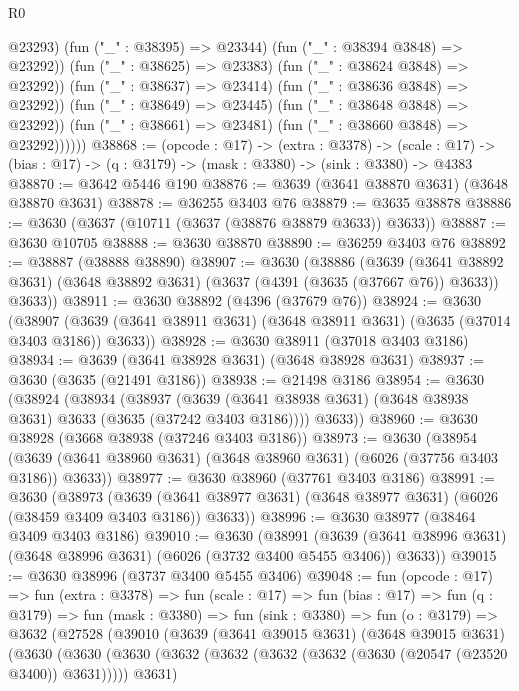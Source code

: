 \begin{lexlean}{R0}
\begin{coremodule}
                        @23293)
                      (fun ("_" : @38395) => @23344)
                      (fun ("_" : @38394 @3848) => @23292))
                    (fun ("_" : @38625) => @23383)
                    (fun ("_" : @38624 @3848) => @23292))
                  (fun ("_" : @38637) => @23414)
                  (fun ("_" : @38636 @3848) => @23292))
                (fun ("_" : @38649) => @23445)
                (fun ("_" : @38648 @3848) => @23292))
              (fun ("_" : @38661) => @23481)
              (fun ("_" : @38660 @3848) => @23292))))))
@38868 := (opcode : @17) ->
  (extra : @3378) ->
  (scale : @17) -> (bias : @17) -> (q : @3179) -> (mask : @3380) -> (sink : @3380) -> @4383
@38870 := @3642 @5446 @190
@38876 := @3639 (@3641 @38870 @3631) (@3648 @38870 @3631)
@38878 := @36255 @3403 @76
@38879 := @3635 @38878
@38886 := @3630 (@3637 (@10711 (@3637 (@38876 @38879 @3633)) @3633))
@38887 := @3630 @10705
@38888 := @3630 @38870
@38890 := @36259 @3403 @76
@38892 := @38887 (@38888 @38890)
@38907 := @3630
    (@38886
      (@3639
        (@3641 @38892 @3631)
        (@3648 @38892 @3631)
        (@3637 (@4391 (@3635 (@37667 @76)) @3633))
        @3633))
@38911 := @3630 @38892 (@4396 (@37679 @76))
@38924 := @3630
    (@38907 (@3639 (@3641 @38911 @3631) (@3648 @38911 @3631) (@3635 (@37014 @3403 @3186)) @3633))
@38928 := @3630 @38911 (@37018 @3403 @3186)
@38934 := @3639 (@3641 @38928 @3631) (@3648 @38928 @3631)
@38937 := @3630 (@3635 (@21491 @3186))
@38938 := @21498 @3186
@38954 := @3630
    (@38924
      (@38934
        (@38937
          (@3639 (@3641 @38938 @3631) (@3648 @38938 @3631) @3633 (@3635 (@37242 @3403 @3186))))
        @3633))
@38960 := @3630 @38928 (@3668 @38938 (@37246 @3403 @3186))
@38973 := @3630
    (@38954 (@3639 (@3641 @38960 @3631) (@3648 @38960 @3631) (@6026 (@37756 @3403 @3186)) @3633))
@38977 := @3630 @38960 (@37761 @3403 @3186)
@38991 := @3630
    (@38973
      (@3639 (@3641 @38977 @3631) (@3648 @38977 @3631) (@6026 (@38459 @3409 @3403 @3186)) @3633))
@38996 := @3630 @38977 (@38464 @3409 @3403 @3186)
@39010 := @3630
    (@38991
      (@3639 (@3641 @38996 @3631) (@3648 @38996 @3631) (@6026 (@3732 @3400 @5455 @3406)) @3633))
@39015 := @3630 @38996 (@3737 @3400 @5455 @3406)
@39048 := fun (opcode : @17) =>
  fun (extra : @3378) =>
  fun (scale : @17) =>
  fun (bias : @17) =>
  fun (q : @3179) =>
  fun (mask : @3380) =>
  fun (sink : @3380) =>
  fun (o : @3179) =>
  @3632
    (@27528
      (@39010
        (@3639
          (@3641 @39015 @3631)
          (@3648 @39015 @3631)
          (@3630
            (@3630
              (@3630 (@3632 (@3632 (@3632 (@3632 (@3630 (@20547 (@23520 @3400)) @3631))))) @3631)

\end{coremodule}
\end{lexlean}
